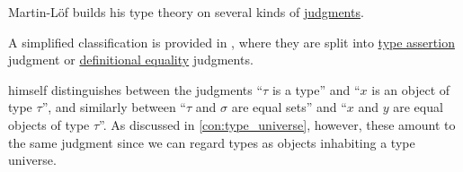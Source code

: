 \begin{remark}\label{rem:typing_judgments}
  Martin-L\"of builds his type theory on several kinds of \hyperref[con:judgment]{judgments}.

  A simplified classification is provided in \cite[19]{UnivalentFoundationsProgram2013HoTT}, where they are split into \hyperref[def:type_assertion]{type assertion} judgment or \hyperref[con:equality]{definitional equality} judgments.

   himself distinguishes between the judgments \enquote{\( \tau \) is a type} and \enquote{\( x \) is an object of type \( \tau \)}, and similarly between \enquote{\( \tau \) and \( \sigma \) are equal sets} and \enquote{\( x \) and \( y \) are equal objects of type \( \tau \)}. As discussed in \cref{con:type_universe}, however, these amount to the same judgment since we can regard types as objects inhabiting a type universe.
\end{remark}

